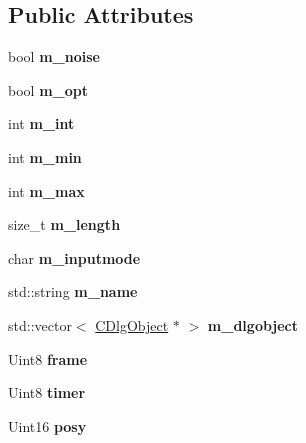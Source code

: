 \subsection*{Public Attributes}
\begin{DoxyCompactItemize}
\item 
\hypertarget{class_c_dialog_a811eaf8e763a3be6c29f1cc02e5e2a7e}{
bool {\bfseries m\_\-noise}}
\label{class_c_dialog_a811eaf8e763a3be6c29f1cc02e5e2a7e}

\item 
\hypertarget{class_c_dialog_a9784abe731765b766f9bae4b50b1bc18}{
bool {\bfseries m\_\-opt}}
\label{class_c_dialog_a9784abe731765b766f9bae4b50b1bc18}

\item 
\hypertarget{class_c_dialog_a1a517718d60c1e68375b2274b283ff9f}{
int {\bfseries m\_\-int}}
\label{class_c_dialog_a1a517718d60c1e68375b2274b283ff9f}

\item 
\hypertarget{class_c_dialog_a2c25f871d18d12e6a78fecff2f188b47}{
int {\bfseries m\_\-min}}
\label{class_c_dialog_a2c25f871d18d12e6a78fecff2f188b47}

\item 
\hypertarget{class_c_dialog_acd666cc1e85fcaddb2b34509c1036d99}{
int {\bfseries m\_\-max}}
\label{class_c_dialog_acd666cc1e85fcaddb2b34509c1036d99}

\item 
\hypertarget{class_c_dialog_a63319f5a20aab9e1827f5a763672fcb0}{
size\_\-t {\bfseries m\_\-length}}
\label{class_c_dialog_a63319f5a20aab9e1827f5a763672fcb0}

\item 
\hypertarget{class_c_dialog_a9cf201e091d60493cd70617179f24809}{
char {\bfseries m\_\-inputmode}}
\label{class_c_dialog_a9cf201e091d60493cd70617179f24809}

\item 
\hypertarget{class_c_dialog_a0eb6a344d9b7e3e5230336d0702e638d}{
std::string {\bfseries m\_\-name}}
\label{class_c_dialog_a0eb6a344d9b7e3e5230336d0702e638d}

\item 
\hypertarget{class_c_dialog_ae51af5ce9628a5181323107e6fac0350}{
std::vector$<$ \hyperlink{class_c_dlg_object}{CDlgObject} $\ast$ $>$ {\bfseries m\_\-dlgobject}}
\label{class_c_dialog_ae51af5ce9628a5181323107e6fac0350}

\item 
\hypertarget{class_c_dialog_ac2c405e91b64b2936e0eb9aab8a6e70f}{
Uint8 {\bfseries frame}}
\label{class_c_dialog_ac2c405e91b64b2936e0eb9aab8a6e70f}

\item 
\hypertarget{class_c_dialog_a8d0722dcf9c26986f9d1e6a57962fca4}{
Uint8 {\bfseries timer}}
\label{class_c_dialog_a8d0722dcf9c26986f9d1e6a57962fca4}

\item 
\hypertarget{class_c_dialog_a804ec2ae17033ec5c963e06e24dcd26e}{
Uint16 {\bfseries posy}}
\label{class_c_dialog_a804ec2ae17033ec5c963e06e24dcd26e}

\end{DoxyCompactItemize}


